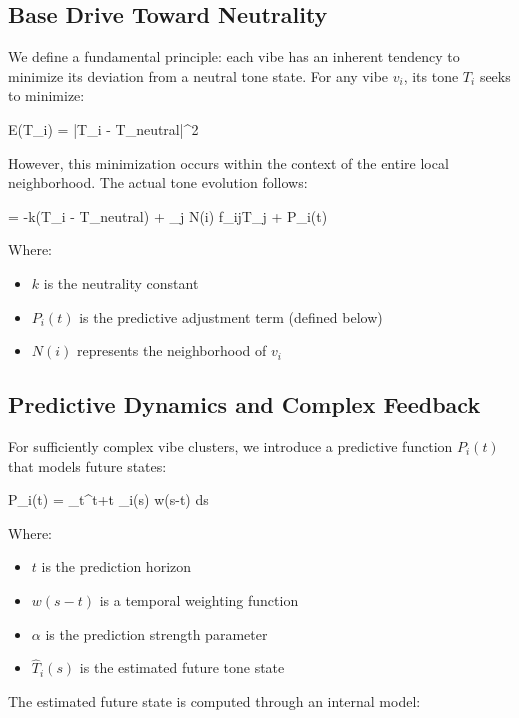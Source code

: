 \documentclass{article}
\let\oldequation\equation
\let\endoldequation\endequation
\renewenvironment{equation}{%
    \noindent\vspace{-\parskip}\vspace{-\baselineskip}%
    \oldequation
}{%
    \endoldequation
    \noindent\vspace{-\parskip}\vspace{-\baselineskip}%
}
\theoremstyle{definition}
\theoremstyle{axiom}
\theoremstyle{theorem}
\theoremstyle{lemma}
\theoremstyle{proposition}
\begin{document}
\subsection{Base Drive Toward Neutrality}

We define a fundamental principle: each vibe has an inherent tendency to minimize its deviation from a neutral tone state. For any vibe $v_i$, its tone $T_i$ seeks to minimize:

\begin{equation}
E(T_i) = |T_i - T_{neutral}|^2
\end{equation}

However, this minimization occurs within the context of the entire local neighborhood. The actual tone evolution follows:

\begin{equation}
 = -k(T_i - T_{neutral}) + \sum_{j \in N(i)} f_{ij}T_j + P_i(t)
\end{equation}

Where:
\begin{itemize}
\item $k$ is the neutrality constant
\item $P_i(t)$ is the predictive adjustment term (defined below)
\item $N(i)$ represents the neighborhood of $v_i$
\end{itemize}

\subsection{Predictive Dynamics and Complex Feedback}

For sufficiently complex vibe clusters, we introduce a predictive function $P_i(t)$ that models future states:

\begin{equation}
P_i(t) = \alpha \int_{t}^{t+{t}} _i(s) w(s-t) ds
\end{equation}

Where:
\begin{itemize}
\item ${t}$ is the prediction horizon
\item $w(s-t)$ is a temporal weighting function
\item $\alpha$ is the prediction strength parameter
\item $\hat{T}_i(s)$ is the estimated future tone state
\end{itemize}

The estimated future state is computed through an internal model:
\end{document}
